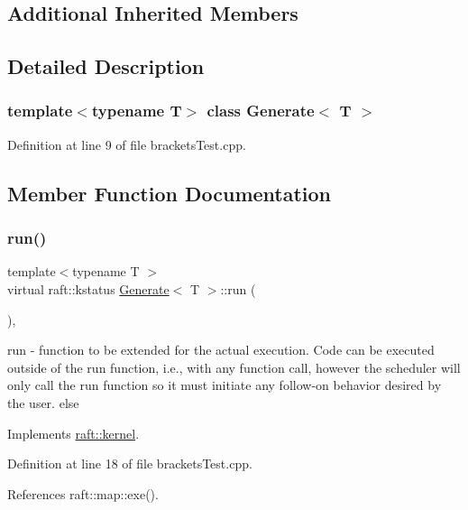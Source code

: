 \subsection*{Additional Inherited Members}


\subsection{Detailed Description}
\subsubsection*{template$<$typename T$>$\newline
class Generate$<$ T $>$}



Definition at line 9 of file brackets\+Test.\+cpp.



\subsection{Member Function Documentation}
\hypertarget{class_generate_aa8253370207e1457b9b79e62253c2925}{}\label{class_generate_aa8253370207e1457b9b79e62253c2925} 
\subsubsection{\texorpdfstring{run()}{run()}}
{\footnotesize\ttfamily template$<$typename T $>$ \\
virtual raft\+::kstatus \hyperlink{class_generate}{Generate}$<$ T $>$\+::run (\begin{DoxyParamCaption}{ }\end{DoxyParamCaption})\hspace{0.3cm}{\ttfamily [inline]}, {\ttfamily [virtual]}}

run -\/ function to be extended for the actual execution. Code can be executed outside of the run function, i.\+e., with any function call, however the scheduler will only call the run function so it must initiate any follow-\/on behavior desired by the user. else 

Implements \hyperlink{classraft_1_1kernel_a05094286d7577360fb1b91c91fc05901}{raft\+::kernel}.



Definition at line 18 of file brackets\+Test.\+cpp.



References raft\+::map\+::exe().


